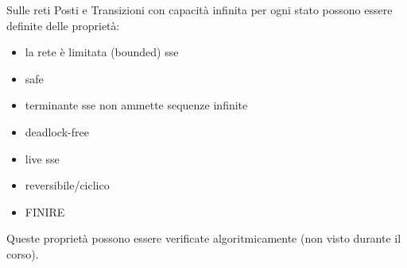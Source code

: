 Sulle reti Posti e Transizioni con capacità infinita per ogni stato
possono essere definite delle proprietà:
\begin{itemize}
    \item la rete è limitata (bounded)  sse
    \item safe
    \item terminante sse non ammette sequenze infinite
    \item deadlock-free
    \item live sse
    \item reversibile/ciclico
    \item FINIRE
\end{itemize}

Queste proprietà possono essere verificate algoritmicamente (non visto durante
il corso).
